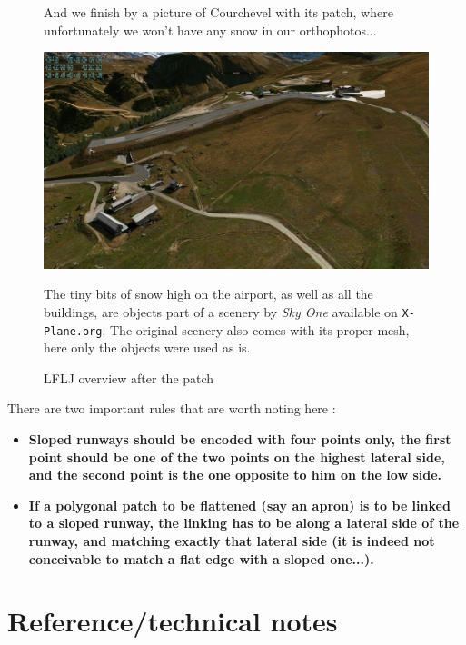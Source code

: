\documentclass[12pt]{article}
\begin{document}
\begin{center}
\begin{figure}[!ht]
And we finish by a picture of Courchevel with its patch, where unfortunately we won't have
any snow in our orthophotos...     \begin{center}
\includegraphics[width=16cm]{Images/LFLJ_overview.png}
\caption{\label{fig:LKJ_overview}LFLJ overview after the patch}
\end{center}
The tiny bits of snow high on the airport, as well as all the buildings, are objects part of a scenery by {\it Sky One} available on {\tt X-Plane.org}. The original scenery also comes with its proper mesh, here only the objects were used as is.
\end{figure}
\end{center}

There are two important rules that are worth noting here :
\begin{itemize}
  \item
  {\bf Sloped runways should be encoded with four points only, the first point should be one of
  the two points on the highest lateral side, and the second point is the one opposite to him on the low side.}
  \item
  {\bf If a polygonal patch to be flattened (say an apron) is to be linked to a sloped runway,
  the linking has to be along a lateral side of the runway, and matching exactly that lateral
  side (it is indeed not conceivable to match a flat edge with a sloped one...).}
\end{itemize}


\section{Reference/technical notes}
\end{document}
